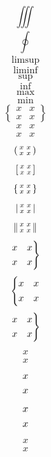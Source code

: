 \documentclass[UTF8,fontset=fandol,scheme=plain]{ctexart}
\begin{document}
\[\iiint\nolimits_{}^{} \]
\[\oint\nolimits_{}^{} \]
\[\limsup_{} \]
\[\liminf_{} \]
\[\sup_{} \]
\[\inf_{} \]
\[\max_{} \]
\[\min_{} \]
\[\begin{Bmatrix}x&x\\x&x\end{Bmatrix}\]
\[\begin{smallmatrix}x&x\\x&x\end{smallmatrix}\]
\[\begin{psmallmatrix}x&x\\x&x\end{psmallmatrix}\]
\[\begin{bsmallmatrix}x&x\\x&x\end{bsmallmatrix}\]
\[\begin{Bsmallmatrix}x&x\\x&x\end{Bsmallmatrix}\]
\[\begin{vsmallmatrix}x&x\\x&x\end{vsmallmatrix}\]
\[\begin{Vsmallmatrix}x&x\\x&x\end{Vsmallmatrix}\]
\[\begin{rcases}x&x\\x&x\end{rcases}\]
\[\begin{dcases}x&x\\x&x\end{dcases}\]
\[\begin{drcases}x&x\\x&x\end{drcases}\]
\[\begin{gathered}x\\x\end{gathered}\]
\[\begin{lgathered}x\\x\end{lgathered}\]
\[\begin{rgathered}x\\x\end{rgathered}\]
\[\begin{multlined}x\\x\end{multlined}\]
\end{document}
